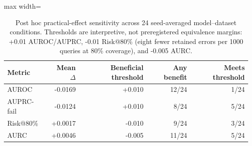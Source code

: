 \begin{table}[t]
\centering
\small
\caption{Post hoc practical-effect sensitivity across 24 seed-averaged model--dataset conditions. Thresholds are interpretive, not preregistered equivalence margins: +0.01 AUROC/AUPRC, -0.01 Risk@80\% (eight fewer retained errors per 1000 queries at 80\% coverage), and -0.005 AURC.}
\label{tab:practical-effect}
\begin{adjustbox}{max width=\textwidth}
\begin{tabular}{lrrrr}
\toprule
Metric & Mean $\Delta$ & Beneficial threshold & Any benefit & Meets threshold \\
\midrule
AUROC & -0.0169 & +0.010 & 12/24 & 1/24 \\
AUPRC-fail & -0.0124 & +0.010 & 8/24 & 5/24 \\
Risk@80\% & +0.0017 & -0.010 & 9/24 & 3/24 \\
AURC & +0.0046 & -0.005 & 11/24 & 5/24 \\
\bottomrule
\end{tabular}
\end{adjustbox}
\end{table}
